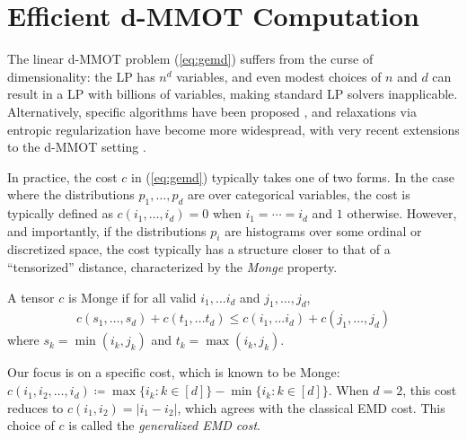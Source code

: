 \section{Efficient d-MMOT Computation}
The linear d-MMOT problem (\ref{eq:gemd}) suffers from the curse of dimensionality: the LP has $n^d$ variables, and even modest choices of $n$ and $d$ can result in a LP with billions of variables, making standard LP solvers inapplicable.
Alternatively, specific algorithms have been proposed  \citep{benamou2015iterative}, and 
relaxations via entropic regularization have become more widespread, with very recent extensions to the d-MMOT setting \citep{tupitsa,mmotcuturi}. 



In practice, the cost $c$ in (\ref{eq:gemd}) typically takes one of two forms. In the case where the distributions $p_1, \ldots, p_d$ are over categorical variables, the cost is typically defined as $c(i_1, \ldots, i_d) = 0$ when $i_1 = \cdots = i_d$ and $1$ otherwise.
However, and importantly, if the distributions $p_i$ are histograms over some ordinal or discretized space, 
the cost typically has a structure 
closer to that of a ``tensorized'' distance, characterized by the {\em Monge} property.
\begin{definition}
A tensor $c$ is Monge if for all valid $i_1, \ldots i_d$ and $j_1, \ldots, j_d$, 
\begin{align}
c(s_1, \ldots, s_d) + c(t_1, \ldots t_d) \leq c(i_1, \ldots i_d) + c(j_1, \ldots, j_d)
\end{align}
where $s_k = \min(i_k, j_k)$ and $t_k = \max(i_k, j_k)$.
\end{definition}
Our focus is on a specific cost, which is known to be Monge: $c(i_1,i_2,\ldots,i_d)\coloneqq \max{\{i_k:k\in[d]\}} - \min{\{i_k:k\in[d]\}}$. When $d=2$, this cost reduces to $c(i_1,i_2)=|i_1-i_2|$, which agrees with the classical EMD cost. This choice of $c$ is called the {\em generalized EMD cost}.


